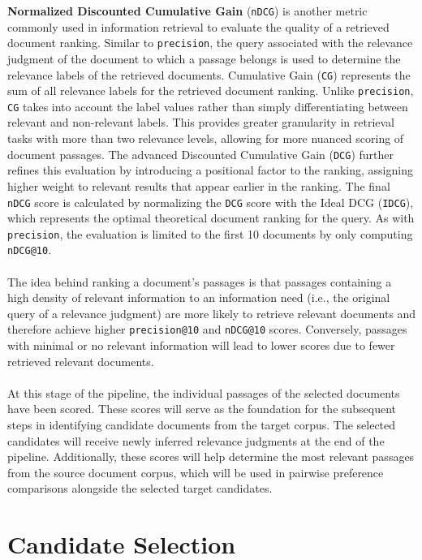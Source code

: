 \textbf{Normalized Discounted Cumulative Gain} (\texttt{nDCG}) is another metric commonly used in information retrieval to evaluate the quality of a retrieved document ranking. Similar to \texttt{precision}, the query associated with the relevance judgment of the document to which a passage belongs is used to determine the relevance labels of the retrieved documents. Cumulative Gain (\texttt{CG}) represents the sum of all relevance labels for the retrieved document ranking. Unlike \texttt{precision}, \texttt{CG} takes into account the label values rather than simply differentiating between relevant and non-relevant labels. This provides greater granularity in retrieval tasks with more than two relevance levels, allowing for more nuanced scoring of document passages. The advanced Discounted Cumulative Gain (\texttt{DCG}) further refines this evaluation by introducing a positional factor to the ranking, assigning higher weight to relevant results that appear earlier in the ranking. The final \texttt{nDCG} score is calculated by normalizing the \texttt{DCG} score with the Ideal DCG (\texttt{IDCG}), which represents the optimal theoretical document ranking for the query. As with \texttt{precision}, the evaluation is limited to the first 10 documents by only computing \texttt{nDCG@10}.
\\\\
The idea behind ranking a document's passages is that passages containing a high density of relevant information to an information need (i.e., the original query of a relevance judgment) are more likely to retrieve relevant documents and therefore achieve higher \texttt{precision@10} and \texttt{nDCG@10} scores. Conversely, passages with minimal or no relevant information will lead to lower scores due to fewer retrieved relevant documents.
\\\\
At this stage of the pipeline, the individual passages of the selected documents have been scored. These scores will serve as the foundation for the subsequent steps in identifying candidate documents from the target corpus. The selected candidates will receive newly inferred relevance judgments at the end of the pipeline. Additionally, these scores will help determine the most relevant passages from the source document corpus, which will be used in pairwise preference comparisons alongside the selected target candidates.


\section{Candidate Selection}\label{candidate-selection}

